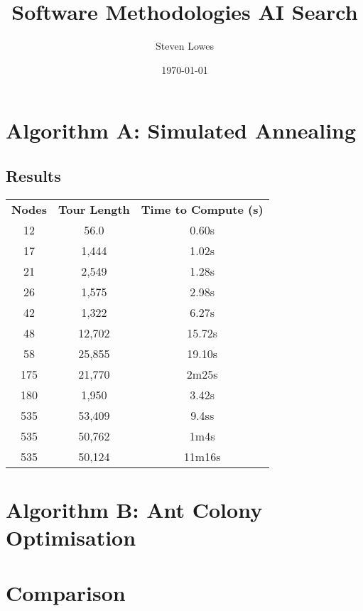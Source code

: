 \documentclass[a4paper, 11pt,table]{article}
\author{Steven Lowes}
\title{Software Methodologies AI Search}
\date{\today{}}
\begin{document}
	\section{Algorithm A: Simulated Annealing}
	
	\subsection{Results}
	\label{useCase:socialRespond}
	\begin{center}
		\begin{tabu}{|c c c|}
			\textbf{Nodes} & \textbf{Tour Length} & \textbf{Time to Compute (s)}\\
			
			12 & 56.0 & 0.60s \\
			17 & 1,444 & 1.02s\\
			21 & 2,549 & 1.28s\\
			26 & 1,575 & 2.98s\\
			42 & 1,322 & 6.27s\\
			48 & 12,702 & 15.72s\\
			58 & 25,855 & 19.10s\\
			175 &  21,770 & 2m25s\\
			180 & 1,950 & 3.42s\\
			535 & 53,409 & 9.4ss\\
			535 & 50,762 & 1m4s\\
			535 & 50,124 & 11m16s\\
		\end{tabu}
	\end{center}
	
	\section{Algorithm B: Ant Colony Optimisation}
	
	\section{Comparison}
	
	\newpage

		\begin{multicols}{2}
		\end{multicols}
    
	
\end{document}

